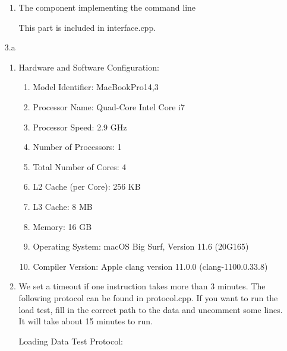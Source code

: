 \documentclass{article}
\begin{document}
\begin{enumerate}
\begin{enumerate}
\item The component implementing the command line

This part is included in interface.cpp.

\end{enumerate}

\item[3.a]
\begin{enumerate}
\item 

Hardware and Software Configuration:

\begin{enumerate}
\item Model Identifier:	MacBookPro14,3

\item Processor Name:	Quad-Core Intel Core i7

\item Processor Speed:	2.9 GHz

\item Number of Processors:	1

\item Total Number of Cores:	4

\item L2 Cache (per Core):	256 KB

\item L3 Cache:	8 MB

\item Memory:	16 GB

\item Operating System: macOS Big Surf, Version 11.6 (20G165)

\item Compiler Version: Apple clang version 11.0.0 (clang-1100.0.33.8)

\end{enumerate}

\item 

We set a timeout if one instruction takes more than 3 minutes. The following protocol can be found in protocol.cpp. If you want to run the load test, fill in the correct path to the data and uncomment some lines. It will take about 15 minutes to run. 

Loading Data Test Protocol:


\end{enumerate}
\end{enumerate}
\end{document}
